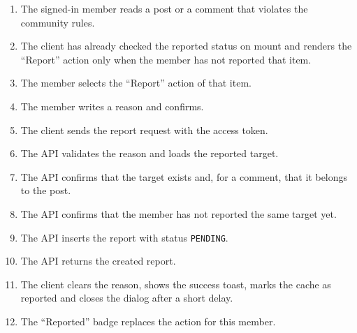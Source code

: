 \begin{enumerate}[leftmargin=1.8em,topsep=3pt,itemsep=2pt,parsep=0pt]
      \item The signed-in member reads a post or a comment that violates the community
            rules.
      \item The client has already checked the reported status on mount and renders the
            ``Report'' action only when the member has not reported that item.
      \item The member selects the ``Report'' action of that item.
      \item The member writes a reason and confirms.
      \item The client sends the report request with the access token.
      \item The API validates the reason and loads the reported target.
      \item The API confirms that the target exists and, for a comment, that it belongs to
            the post.
      \item The API confirms that the member has not reported the same target yet.
      \item The API inserts the report with status \texttt{PENDING}.
      \item The API returns the created report.
      \item The client clears the reason, shows the success toast, marks the cache as
            reported and closes the dialog after a short delay.
      \item The ``Reported'' badge replaces the action for this member.
\end{enumerate}

